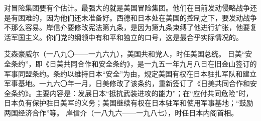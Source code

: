 对冒险集团要有个估计。最强大的就是美国冒险集团。他们在目前发动侵略战争还是有困难的，因为他们还未准备好。西德和日本处在美国的控制之下，要发动战争不那么容易。岸信介要修改宪法第九条，是因为第九条束缚了他进行扩张，他要复活军国主义。你们党的纲领中有和平和独立的口号，这是最合乎实际情况的。

\begin{maonote}
艾森豪威尔（一八九〇——一九六九），美国共和党人，时任美国总统。
日美“安全条约”，即《日美共同合作和安全条约》，是一九五一年九月八日在旧金山签订的军事同盟条约。条约以维持日本“安全”为由，规定美国有权在日本驻扎军队和建立军事基地。一九六〇年一月，日美修改了该条约，重新签订了《日美共同合作和安全条约》。主要内容是：发展日本“抵抗武装进攻的能力”；在“应付共同危险”时，日本负有保护驻日美军的义务；美国继续有权在日本驻军和使用军事基地；“鼓励两国经济合作”等。
岸信介（一八九六——一九八七），时任日本内阁首相。
\end{maonote}
